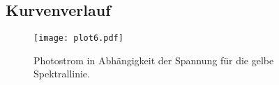 \subsection{Kurvenverlauf}
\label{sec:Kurvenverlauf}
\begin{figure}
    \centering
    \caption{Photostrom in Abhängigkeit der Spannung für die gelbe Spektrallinie.}
    \label{fig:kurve}
    \texttt{[image: plot6.pdf]}
\end{figure}